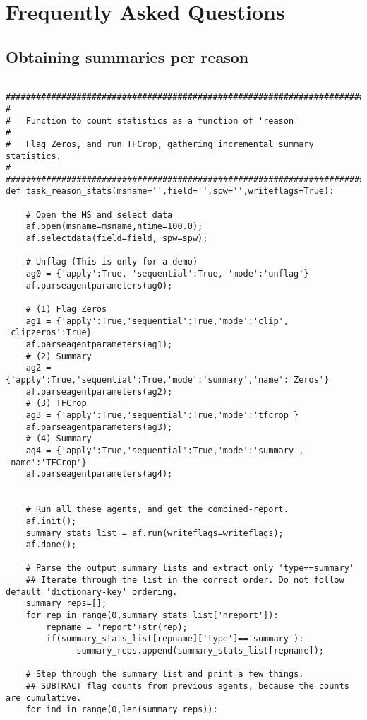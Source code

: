 \section{Frequently Asked Questions}\label{Sec:FAQ}

\subsection{Obtaining summaries per reason}
\begin{verbatim}

#########################################################################
#
#   Function to count statistics as a function of 'reason'
#   
#   Flag Zeros, and run TFCrop, gathering incremental summary statistics.
#
#########################################################################
def task_reason_stats(msname='',field='',spw='',writeflags=True):

    # Open the MS and select data
    af.open(msname=msname,ntime=100.0);
    af.selectdata(field=field, spw=spw);

    # Unflag (This is only for a demo)
    ag0 = {'apply':True, 'sequential':True, 'mode':'unflag'}
    af.parseagentparameters(ag0);

    # (1) Flag Zeros
    ag1 = {'apply':True,'sequential':True,'mode':'clip', 'clipzeros':True}
    af.parseagentparameters(ag1);
    # (2) Summary
    ag2 = {'apply':True,'sequential':True,'mode':'summary','name':'Zeros'}
    af.parseagentparameters(ag2);
    # (3) TFCrop
    ag3 = {'apply':True,'sequential':True,'mode':'tfcrop'}
    af.parseagentparameters(ag3);
    # (4) Summary
    ag4 = {'apply':True,'sequential':True,'mode':'summary', 'name':'TFCrop'}
    af.parseagentparameters(ag4);


    # Run all these agents, and get the combined-report.
    af.init();
    summary_stats_list = af.run(writeflags=writeflags);
    af.done();

    # Parse the output summary lists and extract only 'type==summary'
    ## Iterate through the list in the correct order. Do not follow default 'dictionary-key' ordering.
    summary_reps=[];
    for rep in range(0,summary_stats_list['nreport']):
        repname = 'report'+str(rep);
        if(summary_stats_list[repname]['type']=='summary'):
              summary_reps.append(summary_stats_list[repname]);

    # Step through the summary list and print a few things.
    ## SUBTRACT flag counts from previous agents, because the counts are cumulative.
    for ind in range(0,len(summary_reps)):


\end{verbatim}
